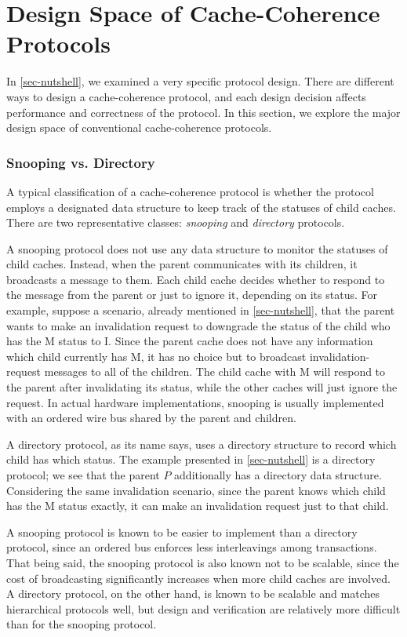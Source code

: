 \section{Design Space of Cache-Coherence Protocols}
\label{sec-design-space}

In \autoref{sec-nutshell}, we examined a very specific protocol design.
There are different ways to design a cache-coherence protocol, and each design decision affects performance and correctness of the protocol.
In this section, we explore the major design space of conventional cache-coherence protocols.

\subsubsection{Snooping vs. Directory}

A typical classification of a cache-coherence protocol is whether the protocol employs a designated data structure to keep track of the statuses of child caches.
There are two representative classes: \emph{snooping} and \emph{directory} protocols.

A snooping protocol does not use any data structure to monitor the statuses of child caches.
Instead, when the parent communicates with its children, it broadcasts a message to them.
Each child cache decides whether to respond to the message from the parent or just to ignore it, depending on its status.
For example, suppose a scenario, already mentioned in \autoref{sec-nutshell}, that the parent wants to make an invalidation request to downgrade the status of the child who has the M status to I.
Since the parent cache does not have any information which child currently has M, it has no choice but to broadcast invalidation-request messages to all of the children.
The child cache with M will respond to the parent after invalidating its status, while the other caches will just ignore the request.
In actual hardware implementations, snooping is usually implemented with an ordered wire bus shared by the parent and children.

A directory protocol, as its name says, uses a directory structure to record which child has which status.
The example presented in \autoref{sec-nutshell} is a directory protocol; we see that the parent $P$ additionally has a directory data structure.
Considering the same invalidation scenario, since the parent knows which child has the M status exactly, it can make an invalidation request just to that child.

A snooping protocol is known to be easier to implement than a directory protocol, since an ordered bus enforces less interleavings among transactions.
That being said, the snooping protocol is also known not to be scalable, since the cost of broadcasting significantly increases when more child caches are involved.
A directory protocol, on the other hand, is known to be scalable and matches hierarchical protocols well, but design and verification are relatively more difficult than for the snooping protocol.

